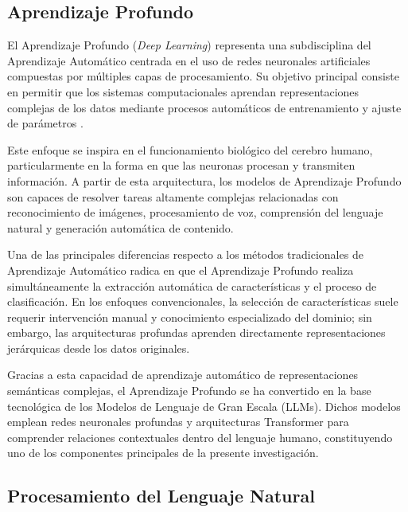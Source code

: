 \subsection{Aprendizaje Profundo}

El Aprendizaje Profundo (\textit{Deep Learning}) representa una subdisciplina del Aprendizaje Automático centrada en el uso de redes neuronales artificiales compuestas por múltiples capas de procesamiento. Su objetivo principal consiste en permitir que los sistemas computacionales aprendan representaciones complejas de los datos mediante procesos automáticos de entrenamiento y ajuste de parámetros \parencite{gl_sas_deeplearning}.

Este enfoque se inspira en el funcionamiento biológico del cerebro humano, particularmente en la forma en que las neuronas procesan y transmiten información. A partir de esta arquitectura, los modelos de Aprendizaje Profundo son capaces de resolver tareas altamente complejas relacionadas con reconocimiento de imágenes, procesamiento de voz, comprensión del lenguaje natural y generación automática de contenido.

Una de las principales diferencias respecto a los métodos tradicionales de Aprendizaje Automático radica en que el Aprendizaje Profundo realiza simultáneamente la extracción automática de características y el proceso de clasificación. En los enfoques convencionales, la selección de características suele requerir intervención manual y conocimiento especializado del dominio; sin embargo, las arquitecturas profundas aprenden directamente representaciones jerárquicas desde los datos originales.

Gracias a esta capacidad de aprendizaje automático de representaciones semánticas complejas, el Aprendizaje Profundo se ha convertido en la base tecnológica de los Modelos de Lenguaje de Gran Escala (LLMs). Dichos modelos emplean redes neuronales profundas y arquitecturas Transformer para comprender relaciones contextuales dentro del lenguaje humano, constituyendo uno de los componentes principales de la presente investigación.

\subsection{Procesamiento del Lenguaje Natural}


